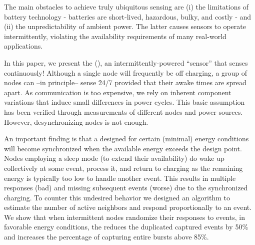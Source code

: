 The main obstacles to achieve truly ubiquitous sensing are (i) the limitations of battery technology - batteries are short-lived, hazardous, bulky, and costly - and (ii) the unpredictability of ambient power. The latter causes sensors to operate intermittently, violating the availability requirements of many real-world applications. 

In this paper, we present the \textit{\fullcis} (\cis), an
intermittently-powered ``sensor'' that senses continuously! Although
a single node will frequently be off charging, a group of nodes can
--in principle-- sense 24/7 provided that their awake times are spread
apart. As communication is too expensive, we rely on inherent component
variations that induce small differences in power cycles. This basic
assumption has been verified through measurements of different nodes
and power sources. However, desynchronizing nodes is not enough.

An important finding is that a \cis designed for certain (minimal)
energy conditions will become synchronized when the available energy
exceeds the design point. Nodes employing a sleep mode (to extend
their availability) do wake up collectively at some event, process it,
and return to charging as the remaining energy is typically too low to
handle another event. This results in multiple responses (bad)
and missing subsequent events (worse) due to the synchronized charging.
To counter this undesired behavior we designed an algorithm to estimate the number of active neighbors and respond proportionally to an event. 
We show that when intermittent nodes randomize their responses to events, in favorable energy conditions, the \cis reduces the duplicated captured events by 50\% and increases the percentage of capturing entire bursts above 85\%. 
